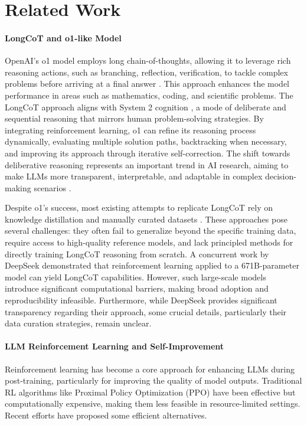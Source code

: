 \section{Related Work}
\paragraph{LongCoT and o1-like Model} 
OpenAI's o1 model \citep{jaech2024openai} employs long chain-of-thoughts, allowing it to leverage rich reasoning actions, such as branching, reflection, verification, to tackle complex problems before arriving at a final answer \citep{dutta2024think}. This approach enhances the model performance in areas such as mathematics, coding, and scientific problems. 
The LongCoT approach aligns with System 2 cognition \citep{kahneman2011thinking}, a mode of deliberate and sequential reasoning that mirrors human problem-solving strategies. By integrating reinforcement learning, o1 can refine its reasoning process dynamically, evaluating multiple solution paths, backtracking when necessary, and improving its approach through iterative self-correction. The shift towards deliberative reasoning represents an important trend in AI research, aiming to make LLMs more transparent, interpretable, and adaptable in complex decision-making scenarios \citep{ackoff1994systems, kahneman2011thinking}.

Despite o1's success, most existing attempts to replicate LongCoT rely on knowledge distillation and manually curated datasets \citep{min2024imitate, huang2024o1}. These approaches pose several challenges: they often fail to generalize beyond the specific training data, require access to high-quality reference models, and lack principled methods for directly training LongCoT reasoning from scratch. A concurrent work by DeepSeek \citep{guo2025deepseek} demonstrated that reinforcement learning applied to a 671B-parameter model can yield LongCoT capabilities. However, such large-scale models introduce significant computational barriers, making broad adoption and reproducibility infeasible. Furthermore, while DeepSeek provides significant transparency regarding their approach, some crucial details, particularly their data curation strategies, remain unclear.


\paragraph{LLM Reinforcement Learning and Self-Improvement}
Reinforcement learning has become a core approach for enhancing LLMs during post-training, particularly for improving the quality of model outputs. Traditional RL algorithms like Proximal Policy Optimization (PPO) \citep{schulman2017ppo} have been effective but computationally expensive, making them less feasible in resource-limited settings. 
Recent efforts have proposed some efficient alternatives. 

